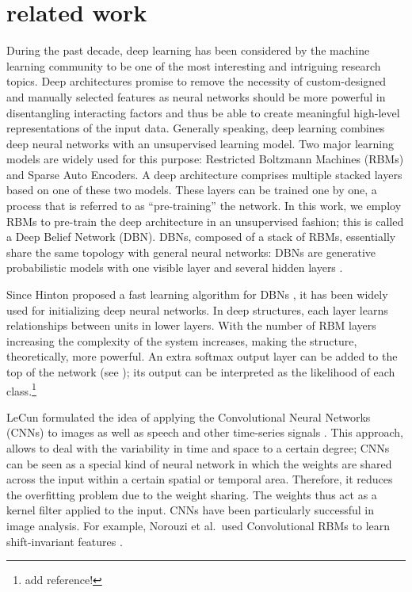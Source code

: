 \documentclass{article}
\begin{document}
\section{related work}
During the past decade, deep learning has been considered by the machine learning community to be one of the most interesting and intriguing research topics. Deep architectures promise to remove the necessity of custom-designed and manually selected features as neural networks should be more powerful in disentangling interacting factors and thus be able to create meaningful high-level representations of the input data. Generally speaking, deep learning combines deep neural networks with an unsupervised learning model. Two major learning models are widely used for this purpose: Restricted Boltzmann Machines (RBMs) and Sparse Auto Encoders. A deep architecture comprises multiple stacked layers based on one of these two models. These layers can be trained one by one, a process that is referred to as ``pre-training'' the network. In this work, we employ RBMs to pre-train the deep architecture in an unsupervised fashion; this is called a Deep Belief Network (DBN). DBNs, composed of a stack of RBMs, essentially share the same topology with general neural networks: DBNs are generative probabilistic models with one visible layer and several hidden layers \cite{hinton2006fast}. 

Since Hinton proposed a fast learning algorithm for DBNs \cite{hinton2006fast}, it has been widely used for initializing deep neural networks. In deep structures, each layer learns relationships between units in lower layers. With the number of RBM layers increasing the complexity of the system increases, making the structure, theoretically, more powerful. An extra softmax output layer can be added to the top of the network (see ); its output can be interpreted as the likelihood of each class.\footnote{add reference!}

LeCun formulated the idea of applying the Convolutional Neural Networks (CNNs) to images as well as speech and other time-series signals \cite{lecun1995convolutional}. This approach, allows to deal with the variability in time and space to a certain degree; CNNs can be seen as a special kind of neural network in which the weights are shared across the input within a certain spatial or temporal area. Therefore, it reduces the overfitting problem due to the weight sharing. The weights thus act as a kernel filter applied to the input. CNNs have been particularly successful in image analysis. For example, Norouzi et al.\ used Convolutional RBMs to learn shift-invariant features \cite{norouzi2009stacks}. 
\end{document}
